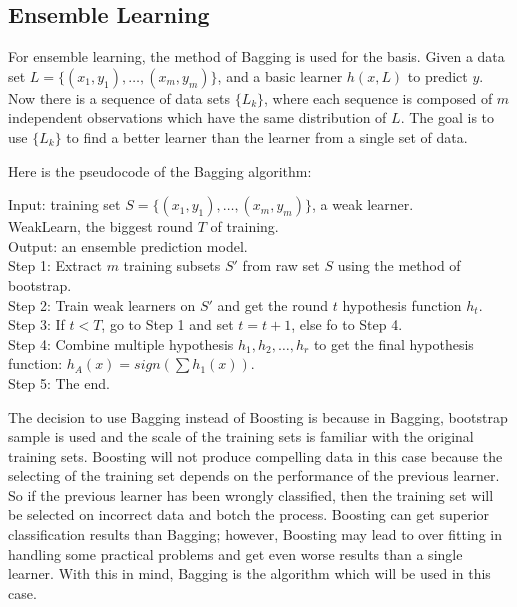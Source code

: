 \documentclass[11pt,technote,twocolumn]{IEEEtran}
\begin{document}
\subsection{Ensemble Learning}
For ensemble learning, the method of Bagging is used for the basis. Given a data set $L = \{(x_1,y_1), \ldots, (x_m,y_m)\}$, and a basic learner $h(x,L)$ to predict $y$. Now there is a sequence of data sets $\{L_k\}$, where each sequence is composed of $m$ independent observations which have the same distribution of $L$. The goal is to use $\{L_k\}$ to find a better learner than the learner from a single set of data.
\par
Here is the pseudocode of the Bagging algorithm:
\begin{flushleft}
Input: training set $S = \{(x_1,y_1), \ldots, (x_m,y_m)\}$, a weak learner.
\\
WeakLearn, the biggest round $T$ of training.
\\
\hspace{5mm} Output: an ensemble prediction model.
\\
\hspace{5mm} Step 1: Extract $m$ training subsets $S'$ from raw set $S$ using the method of bootstrap.
\\
\hspace{5mm} Step 2: Train weak learners on $S'$ and get the round $t$ hypothesis function $h_t$.
\\
\hspace{5mm} Step 3: If $t < T$, go to Step 1 and set $t=t+1$, else fo to Step 4.
\\
\hspace{5mm} Step 4: Combine multiple hypothesis $h_1,h_2, \ldots, h_r$ to get the final hypothesis function: $h_A (x) = sign(\sum h_1(x))$.
\\
\hspace{5mm} Step 5: The end.
\end{flushleft}
\par
The decision to use Bagging instead of Boosting is because in Bagging, bootstrap sample is used and the scale of the training sets is familiar with the original training sets. Boosting will not produce compelling data in this case because the selecting of the training set depends on the performance of the previous learner. So if the previous learner has been wrongly classified, then the training set will be selected on incorrect data and botch the process. Boosting can get superior classification results than Bagging; however, Boosting may lead to over fitting in handling some practical problems and get even worse results than a single learner. With this in mind, Bagging is the algorithm which will be used in this case. \cite{4663330}
\end{document}
